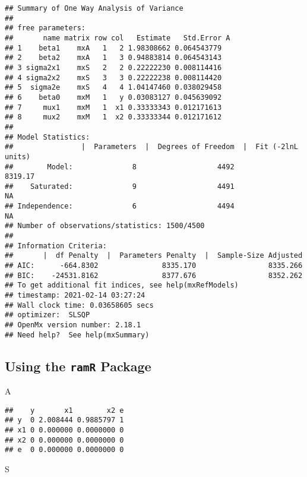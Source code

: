 \documentclass[
]{book}
\newenvironment{Shaded}{\begin{snugshade}}{\end{snugshade}}
\newcommand{\NormalTok}[1]{#1}
\theoremstyle{definition}
\theoremstyle{definition}
\theoremstyle{definition}
\theoremstyle{remark}
\begin{document}
\begin{verbatim}
## Summary of One Way Analysis of Variance 
##  
## free parameters:
##       name matrix row col   Estimate   Std.Error A
## 1    beta1    mxA   1   2 1.98308662 0.064543779  
## 2    beta2    mxA   1   3 0.94883814 0.064543143  
## 3 sigma2x1    mxS   2   2 0.22222230 0.008114416  
## 4 sigma2x2    mxS   3   3 0.22222238 0.008114420  
## 5  sigma2e    mxS   4   4 1.04147460 0.038029458  
## 6    beta0    mxM   1   y 0.03083127 0.045639092  
## 7     mux1    mxM   1  x1 0.33333343 0.012171613  
## 8     mux2    mxM   1  x2 0.33333344 0.012171612  
## 
## Model Statistics: 
##                |  Parameters  |  Degrees of Freedom  |  Fit (-2lnL units)
##        Model:              8                   4492               8319.17
##    Saturated:              9                   4491                    NA
## Independence:              6                   4494                    NA
## Number of observations/statistics: 1500/4500
## 
## Information Criteria: 
##       |  df Penalty  |  Parameters Penalty  |  Sample-Size Adjusted
## AIC:      -664.8302               8335.170                 8335.266
## BIC:    -24531.8162               8377.676                 8352.262
## To get additional fit indices, see help(mxRefModels)
## timestamp: 2021-02-14 03:27:24 
## Wall clock time: 0.03658605 secs 
## optimizer:  SLSQP 
## OpenMx version number: 2.18.1 
## Need help?  See help(mxSummary)
\end{verbatim}

\hypertarget{using-the-ramr-package-3}{%
\subsection{\texorpdfstring{Using the \texttt{ramR} Package}{Using the ramR Package}}\label{using-the-ramr-package-3}}

\begin{Shaded}
\begin{Highlighting}[]
\NormalTok{A}
\end{Highlighting}
\end{Shaded}

\begin{verbatim}
##    y       x1        x2 e
## y  0 2.008444 0.9885797 1
## x1 0 0.000000 0.0000000 0
## x2 0 0.000000 0.0000000 0
## e  0 0.000000 0.0000000 0
\end{verbatim}

\begin{Shaded}
\begin{Highlighting}[]
\NormalTok{S}
\end{Highlighting}
\end{Shaded}
\end{document}
